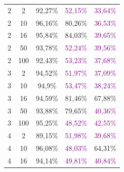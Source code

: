 \begin{table}[ht]
\begin{tabular}{cc|c|c|c}
        {2}                           & {2}       & {92,27\%}                           & \textcolor{purple}{52,15\%}         & \textcolor{purple}{33,64\%}              \\
        {2}                           & {10}      & {96,16\%}                           & {80,26\%}                           & \textcolor{purple}{36,53\%}              \\
        {2}                           & {16}      & {95,84\%}                           & {84,03\%}                           & \textcolor{purple}{39,65\%}              \\
        {2}                           & {50}      & {93,78\%}                           & \textcolor{purple}{52,24\%}         & \textcolor{purple}{39,56\%}              \\
        {2}                           & {100}     & {92,43\%}                           & \textcolor{purple}{53,23\%}         & \textcolor{purple}{37,68\%}              \\
        {3}                           & {2}       & {94,52\%}                           & \textcolor{purple}{51,97\%}         & \textcolor{purple}{37,09\%}              \\
        {3}                           & {10}      & {94,9\%}                            & \textcolor{purple}{53,47\%}         & \textcolor{purple}{38,24\%}              \\
        {3}                           & {16}      & {94,59\%}                           & {81,46\%}                           & {67,88\%}                                \\
        {3}                           & {50}      & {93,88\%}                           & {79,65\%}                           & \textcolor{purple}{40,36\%}              \\
        {3}                           & {100}     & {95,25\%}                           & \textcolor{purple}{48,52\%}         & \textcolor{purple}{42,55\%}              \\
        {4}                           & {2}       & {89,15\%}                           & \textcolor{purple}{51,98\%}         & \textcolor{purple}{39,68\%}              \\
        {4}                           & {10}      & {96,08\%}                           & \textcolor{purple}{48,03\%}         & {64,31\%}                                \\
        {4}                           & {16}      & {94,14\%}                           & \textcolor{purple}{49,81\%}         & \textcolor{purple}{40,84\%}              \\

\end{tabular}
\end{table}

